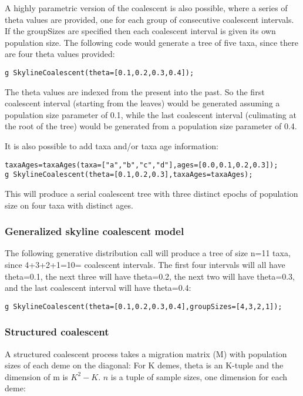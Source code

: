 \documentclass[10pt,letterpaper,table]{article}
\begin{document}
{A highly parametric version of the coalescent is also possible, where
a series of theta values are provided, one for each group of consecutive coalescent intervals.
If the groupSizes are specified then each coalescent interval is given its
own population size.
The following code would generate a tree of five taxa, since there are four theta values provided:

\begin{alltt}
  g ~ SkylineCoalescent(theta=[0.1, 0.2, 0.3, 0.4]);
\end{alltt}

The theta values are indexed from the present into the past.
So the first coalescent interval (starting from the leaves)
would be generated assuming a population size parameter of 0.1, while
the last coalescent interval (culimating at the root of the tree)
would be generated from a population size parameter of 0.4.

It is also possible to add taxa and/or taxa age information:

\begin{alltt}
  taxaAges = taxaAges(taxa=["a", "b", "c", "d"], ages=[0.0, 0.1, 0.2, 0.3]);
  g ~ SkylineCoalescent(theta=[0.1, 0.2, 0.3], taxaAges=taxaAges);
\end{alltt}

This will produce a serial coalescent tree with three distinct epochs
of population size on four taxa with distinct ages.

\subsubsection*{Generalized skyline coalescent model}

The following generative distribution call will produce a tree of size
n=11 taxa, since 4+3+2+1=10= coalescent intervals.
The first four intervals will all have theta=0.1, the next three will
have theta=0.2, the next two will have theta=0.3, and the last
coalescent interval will have theta=0.4:

\begin{alltt}
  g ~ SkylineCoalescent(theta=[0.1, 0.2, 0.3, 0.4], groupSizes=[4,3,2,1]);
\end{alltt}

\subsubsection*{Structured coalescent}

A structured coalescent process takes a migration matrix (M) with
population sizes of each deme on the diagonal:
For K demes, theta is an K-tuple and the dimension of m is $K^2 -
K$. $n$ is a tuple of sample sizes, one dimension for each deme:

}
\end{document}
